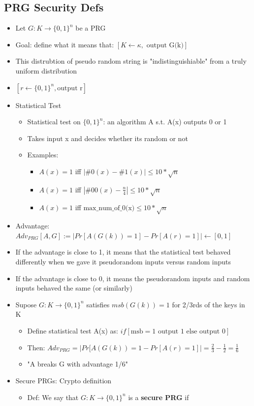 \documentclass[]{article}
\begin{document}
\subsection{PRG Security Defs}
\begin{itemize}
	\item Let $G:K \rightarrow \{0,1\}^{n}$ be a PRG
	\item Goal: define what it means that: $[K \leftarrow \kappa, \text{ output G(k)}]$
	\item This distrubtion of pseudo random string is "indistinguishiable" from a truly uniform distribution
	\item $[r \leftarrow \{0,1\}^{n}, \text{output r}]$
	\item Statistical Test
	\begin{itemize}
		\item Statistical test on $\{0,1\}^{n}$: an algorithm A s.t. A(x) outputs 0 or 1
		\item Takes input x and decides whether its random or not
		\item Examples: 
		\begin{itemize}
			\item $A(x) = 1 $ iff $|\#0(x) - \#1(x)| \leq 10 * \sqrt{n}$
			\item $A(x) = 1 $ iff $|\#00(x) - \frac{n}{4}| \leq 10 * \sqrt{n}$
			\item $A(x) = 1 $ iff $\text{max\_num\_of\_0(x)} \leq 10 * \sqrt{n}$
		\end{itemize}
	\end{itemize}
	\item Advantage: $Adv_{PRG}[A,G] := |Pr[A(G(k)) = 1] - Pr[A(r) = 1]| \leftarrow [0,1]$
	\item If the advantage is close to 1, it means that the statistical test behaved differently when we gave it pseudorandom inputs versus random inputs
	\item If the advantage is close to 0, it means the pseudorandom inputs and random inputs behaved the same (or similarly)
	\item Supose $G:K \rightarrow \{0,1\}^{n}$ satisfies $msb(G(k)) = 1$ for 2/3rds of the keys in K
	\begin{itemize}
		\item Define statistical test A(x) as: $if [\text{msb} = 1 \text{ output 1 else output 0}]$
		\item Then: $Adv_{PRG} = |Pr[A(G(k)) = 1 - Pr[A(r) = 1]| = \frac{2}{3} - \frac{1}{2} = \frac{1}{6}$
		\item "A breaks G with advantage 1/6"
	\end{itemize}
	\item Secure PRGs: Crypto definition
	\begin{itemize}
		\item Def: We say that $G:K \rightarrow \{0,1\}^{n}$ is a \textbf{secure PRG} if
	\end{itemize}
\end{itemize}
\end{document}
